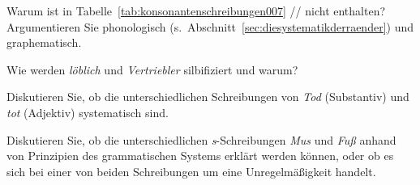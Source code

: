 \Uebung[\tristar]{} \label{exc:phonologischeschreibprinzipien07} Warum ist in Tabelle~\ref{tab:konsonantenschreibungen007} // nicht enthalten?
Argumentieren Sie phonologisch (s.\ Abschnitt~\ref{sec:diesystematikderraender}) und graphematisch.

\Uebung[\tristar]{} \label{exc:phonologischeschreibprinzipien08} Wie werden \textit{löblich} und \textit{Vertriebler} silbifiziert und warum?

\Uebung[\tristar]{} \label{exc:phonologischeschreibprinzipien09} Diskutieren Sie, ob die unterschiedlichen Schreibungen von \textit{Tod} (Substantiv) und \textit{tot} (Adjektiv) systematisch sind.

\Uebung[\tristar]{} \label{exc:phonologischeschreibprinzipien10} Diskutieren Sie, ob die unterschiedlichen \textit{s}-Schreibungen \textit{Mus} und \textit{Fuß} anhand von Prinzipien des grammatischen Systems erklärt werden können, oder ob es sich bei einer von beiden Schreibungen um eine Unregelmäßigkeit handelt.
